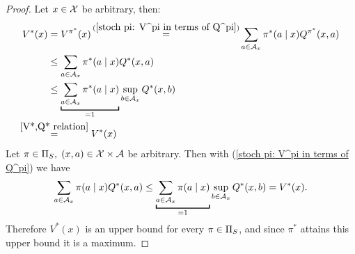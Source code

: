 \begin{proof}
	\xToy{\ref{ii:1}}{\ref{ii:2}} Let \(x\in\mathcal{X}\) be arbitrary, then:
	\begin{align*}
		V^*(x)&=V^{\pi^*}(x)\xeq{(\ref{stoch pi: V^pi in terms of Q^pi})}
		\sum_{a\in\cA_x}\pi^*(a\mid x) Q^{\pi^*}(x,a) \nonumber\\
		&\le \sum_{a\in\cA_x}\pi^*(a\mid x) Q^*(x,a)\\
		&\le \underbracket[1pt]{\sum_{a\in\cA_x}\pi^*(a\mid x)}_{=1} 
		\sup_{b\in\cA_x}Q^*(x,b) \nonumber\\
		&\lxeq{\ref{V*,Q* relation}}V^*(x) \nonumber
	\end{align*}
	\xToy{\ref{ii:2}}{\ref{ii:3}} Let \(\pi\in\Pi_S,\; (x,a)\in\mathcal{X}\times\mathcal{A}\) be arbitrary. Then with (\ref{stoch pi: V^pi in terms of Q^pi}) we have
	\[
		\sum_{a\in\cA_x}\pi(a\mid x) Q^*(x,a)
		\le \underbracket[1pt]{\sum_{a\in\cA_x}\pi(a\mid x)}_{=1}
		\sup_{b\in\cA_x}Q^*(x,b)=V^*(x).
	\]
	Therefore \(V^* (x)\) is an upper bound for every \(\pi\in\Pi_S\), and since \(\pi^*\) attains this upper bound it is a maximum.


\end{proof}
